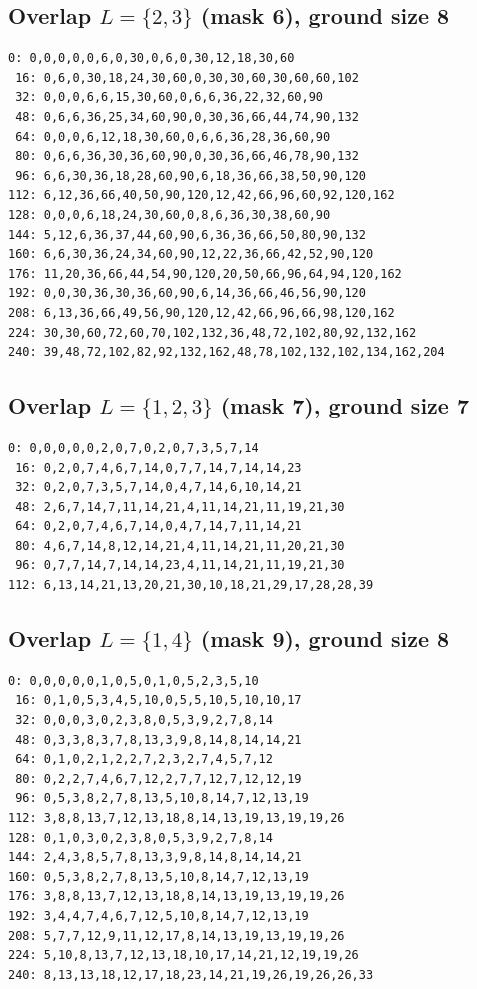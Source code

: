\documentclass[11pt]{article}
\begin{document}
\subsection*{Overlap $L=\{2,3\}$ (mask 6), ground size 8}
\begin{Verbatim}[fontsize=\footnotesize]
  0: 0,0,0,0,0,6,0,30,0,6,0,30,12,18,30,60
 16: 0,6,0,30,18,24,30,60,0,30,30,60,30,60,60,102
 32: 0,0,0,6,6,15,30,60,0,6,6,36,22,32,60,90
 48: 0,6,6,36,25,34,60,90,0,30,36,66,44,74,90,132
 64: 0,0,0,6,12,18,30,60,0,6,6,36,28,36,60,90
 80: 0,6,6,36,30,36,60,90,0,30,36,66,46,78,90,132
 96: 6,6,30,36,18,28,60,90,6,18,36,66,38,50,90,120
112: 6,12,36,66,40,50,90,120,12,42,66,96,60,92,120,162
128: 0,0,0,6,18,24,30,60,0,8,6,36,30,38,60,90
144: 5,12,6,36,37,44,60,90,6,36,36,66,50,80,90,132
160: 6,6,30,36,24,34,60,90,12,22,36,66,42,52,90,120
176: 11,20,36,66,44,54,90,120,20,50,66,96,64,94,120,162
192: 0,0,30,36,30,36,60,90,6,14,36,66,46,56,90,120
208: 6,13,36,66,49,56,90,120,12,42,66,96,66,98,120,162
224: 30,30,60,72,60,70,102,132,36,48,72,102,80,92,132,162
240: 39,48,72,102,82,92,132,162,48,78,102,132,102,134,162,204
\end{Verbatim}
\subsection*{Overlap $L=\{1,2,3\}$ (mask 7), ground size 7}
\begin{Verbatim}[fontsize=\footnotesize]
  0: 0,0,0,0,0,2,0,7,0,2,0,7,3,5,7,14
 16: 0,2,0,7,4,6,7,14,0,7,7,14,7,14,14,23
 32: 0,2,0,7,3,5,7,14,0,4,7,14,6,10,14,21
 48: 2,6,7,14,7,11,14,21,4,11,14,21,11,19,21,30
 64: 0,2,0,7,4,6,7,14,0,4,7,14,7,11,14,21
 80: 4,6,7,14,8,12,14,21,4,11,14,21,11,20,21,30
 96: 0,7,7,14,7,14,14,23,4,11,14,21,11,19,21,30
112: 6,13,14,21,13,20,21,30,10,18,21,29,17,28,28,39
\end{Verbatim}
\subsection*{Overlap $L=\{1,4\}$ (mask 9), ground size 8}
\begin{Verbatim}[fontsize=\footnotesize]
  0: 0,0,0,0,0,1,0,5,0,1,0,5,2,3,5,10
 16: 0,1,0,5,3,4,5,10,0,5,5,10,5,10,10,17
 32: 0,0,0,3,0,2,3,8,0,5,3,9,2,7,8,14
 48: 0,3,3,8,3,7,8,13,3,9,8,14,8,14,14,21
 64: 0,1,0,2,1,2,2,7,2,3,2,7,4,5,7,12
 80: 0,2,2,7,4,6,7,12,2,7,7,12,7,12,12,19
 96: 0,5,3,8,2,7,8,13,5,10,8,14,7,12,13,19
112: 3,8,8,13,7,12,13,18,8,14,13,19,13,19,19,26
128: 0,1,0,3,0,2,3,8,0,5,3,9,2,7,8,14
144: 2,4,3,8,5,7,8,13,3,9,8,14,8,14,14,21
160: 0,5,3,8,2,7,8,13,5,10,8,14,7,12,13,19
176: 3,8,8,13,7,12,13,18,8,14,13,19,13,19,19,26
192: 3,4,4,7,4,6,7,12,5,10,8,14,7,12,13,19
208: 5,7,7,12,9,11,12,17,8,14,13,19,13,19,19,26
224: 5,10,8,13,7,12,13,18,10,17,14,21,12,19,19,26
240: 8,13,13,18,12,17,18,23,14,21,19,26,19,26,26,33
\end{Verbatim}
\end{document}
